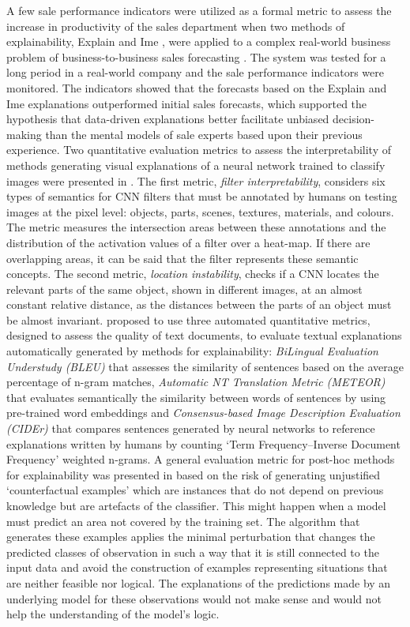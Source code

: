 \documentclass[final,1p,times]{elsarticle}
\begin{document}
A few sale performance indicators were utilized as a formal metric to assess the increase in productivity of the sales department when two methods of explainability, Explain and Ime \cite{robnik2008explaining,robnik2018explanation}, were applied to a complex real-world business problem of business-to-business sales forecasting \cite{bohanec2017decision, bohanec2017explaining}. The system was tested for a long period in a real-world company and the sale performance indicators were monitored. The indicators showed that the forecasts based on the Explain and Ime explanations outperformed initial sales forecasts, which supported the hypothesis that data-driven explanations better facilitate unbiased decision-making than the mental models of sale experts based upon their previous experience.
Two quantitative evaluation metrics to assess the interpretability of methods generating visual explanations of a neural network trained to classify images were presented in \cite{zhang2018visual}. 
The first metric, \textit{filter interpretability}, considers six types of semantics for CNN filters that must be annotated by humans on testing images at the pixel level: objects, parts, scenes, textures, materials, and colours. The metric measures the intersection areas between these annotations and the distribution of the activation values of a filter over a heat-map. If there are overlapping areas, it can be said that the filter represents these semantic concepts. The second metric, \textit{location instability}, checks if a CNN locates the relevant parts of the same object, shown in different images, at an almost constant relative distance, as the distances between the parts of an object must be almost invariant.
\cite{barratt2017interpnet} proposed to use three automated quantitative metrics, designed to assess the quality of text documents, to evaluate textual explanations automatically generated by methods for explainability: \textit{BiLingual Evaluation Understudy (BLEU)} that assesses the similarity of sentences based on the average percentage of n-gram matches, \textit{Automatic NT Translation Metric (METEOR)} that evaluates semantically the similarity between words of sentences by using pre-trained word embeddings and \textit{Consensus-based Image Description Evaluation (CIDEr)} that compares sentences generated by neural networks to reference explanations written by humans by counting `Term Frequency–Inverse Document Frequency' weighted n-grams.
A general evaluation metric for post-hoc methods for explainability was presented in \cite{laugel2019dangers} based on the risk of generating unjustified `counterfactual examples' which are instances that do not depend on previous knowledge but are artefacts of the classifier. This might happen when a model must predict an area not covered by the training set. The algorithm that generates these examples applies the minimal perturbation that changes the predicted classes of observation in such a way that it is still connected to the input data and avoid the construction of examples representing situations that are neither feasible nor logical. The explanations of the predictions made by an underlying model for these observations would not make sense and would not help the understanding of the model's logic. \\
\end{document}
